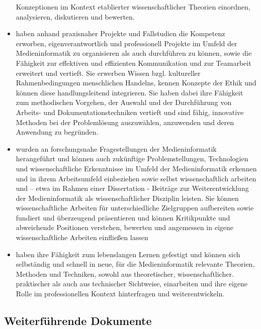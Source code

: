 \begin{itemize}
  Konzeptionen im Kontext etablierter wissenschaftlicher Theorien
  einordnen, analysieren, diskutieren und bewerten.
\item
  haben anhand praxisnaher Projekte und Fallstudien die Kompetenz
  erworben, eigenverantwortlich und professionell Projekte im Umfeld der
  Medieninformatik zu organisieren als auch durchführen zu können, sowie
  die Fähigkeit zur effektiven und effizienten Kommunikation und zur
  Teamarbeit erweitert und vertieft. Sie erwerben Wissen bzgl.
  kultureller Rahmenbedingungen menschlichen Handelns, kennen Konzepte
  der Ethik und können diese handlungsleitend integrieren. Sie haben
  dabei ihre Fähigkeit zum methodischen Vorgehen, der Auswahl und der
  Durchführung von Arbeits- und Dokumentationstechniken vertieft und
  sind fähig, innovative Methoden bei der Problemlösung auszuwählen,
  anzuwenden und deren Anwendung zu begründen.
\item
  wurden an forschungsnahe Fragestellungen der Medieninformatik
  herangeführt und können auch zukünftige Problemstellungen,
  Technologien und wissenschaftliche Erkenntnisse im Umfeld der
  Medieninformatik erkennen und in ihrem Arbeitsumfeld einbeziehen sowie
  selbst wissenschaftlich arbeiten und -- etwa im Rahmen einer
  Dissertation - Beiträge zur Weiterentwicklung der Medieninformatik als
  wissenschaftlicher Disziplin leisten. Sie können wissenschaftliche
  Arbeiten für unterschiedliche Zielgruppen aufbereiten sowie fundiert
  und überzeugend präsentieren und können Kritikpunkte und abweichende
  Positionen verstehen, bewerten und angemessen in eigene
  wissenschaftliche Arbeiten einfließen lassen
\item
  haben ihre Fähigkeit zum lebenslangen Lernen gefestigt und können sich
  selbständig und schnell in neue, für die Medieninformatik relevante
  Theorien, Methoden und Techniken, sowohl aus theoretischer,
  wissenschaftlicher. praktischer als auch aus technischer Sichtweise,
  einarbeiten und ihre eigene Rolle im professionellen Kontext
  hinterfragen und weiterentwickeln.
\end{itemize}

\subsection{Weiterführende
Dokumente\label{/mi-2017/selbstbericht/0200-qualifikationsziele/0000-qualifikationsziele}}\label{weiterfuxfchrende-dokumentepathlabelmi-2017selbstbericht0200-qualifikationsziele0000-qualifikationsziele-1}

